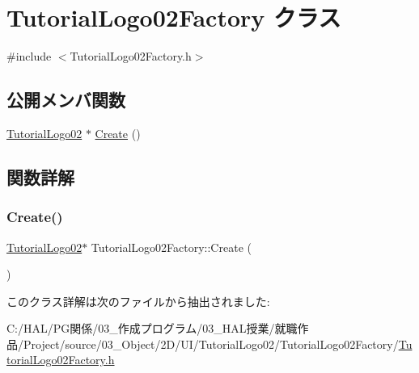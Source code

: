 \hypertarget{class_tutorial_logo02_factory}{}\section{Tutorial\+Logo02\+Factory クラス}
\label{class_tutorial_logo02_factory}


{\ttfamily \#include $<$Tutorial\+Logo02\+Factory.\+h$>$}

\subsection*{公開メンバ関数}
\begin{DoxyCompactItemize}
\item 
\mbox{\hyperlink{class_tutorial_logo02}{Tutorial\+Logo02}} $\ast$ \mbox{\hyperlink{class_tutorial_logo02_factory_a24fdf8b5500a67badf1758009d09569b}{Create}} ()
\end{DoxyCompactItemize}


\subsection{関数詳解}
\mbox{\label{class_tutorial_logo02_factory_a24fdf8b5500a67badf1758009d09569b}} 
\subsubsection{\texorpdfstring{Create()}{Create()}}
{\footnotesize\ttfamily \mbox{\hyperlink{class_tutorial_logo02}{Tutorial\+Logo02}}$\ast$ Tutorial\+Logo02\+Factory\+::\+Create (\begin{DoxyParamCaption}{ }\end{DoxyParamCaption})\hspace{0.3cm}{\ttfamily [inline]}}



このクラス詳解は次のファイルから抽出されました\+:\begin{DoxyCompactItemize}
\item 
C\+:/\+H\+A\+L/\+P\+G関係/03\+\_\+作成プログラム/03\+\_\+\+H\+A\+L授業/就職作品/\+Project/source/03\+\_\+\+Object/2\+D/\+U\+I/\+Tutorial\+Logo02/\+Tutorial\+Logo02\+Factory/\mbox{\hyperlink{_tutorial_logo02_factory_8h}{Tutorial\+Logo02\+Factory.\+h}}\end{DoxyCompactItemize}
